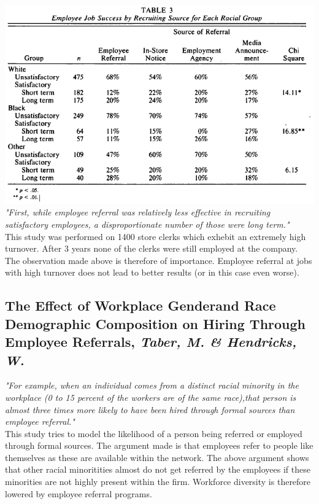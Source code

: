 \documentclass[a4paper, 11pt]{article} %
\begin{document}
\includegraphics[width=\textwidth]{table3} \\

\emph{"First, while employee referral was relatively
less effective in recruiting satisfactory employees, a disproportionate
number of those were long term."} \\

This study was performed on 1400 store clerks which exhebit an extremely high turnover. After 3 years none of the clerks were still employed at the company. The observation made above is therefore of importance. Employee referral at jobs with high turnover does not lead to better results (or in this case even worse).

\subsection*{The Effect of Workplace Genderand Race Demographic Composition on Hiring Through Employee Referrals, \emph{Taber, M. \& Hendricks, W.} \cite{third}}

\emph{"For example, when an individual comes from a distinct racial
minority in the workplace (0 to 15 percent of the workers are of the same race),that person is almost three times more likely to have been hired through formal sources than employee referral."}\\

This study tries to model the likelihood of a person being referred or employed through formal sources. The argument made is that employees refer to people like themselves as these are available within the network. The above argument shows that other racial minoritities almost do not get referred by the employees if these minorities are not highly present within the firm. Workforce diversity is therefore lowered by employee referral programs.
\end{document}
